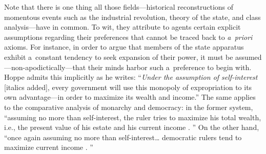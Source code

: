 Note that there is one thing all those fields---historical reconstructions of momentous events such as the industrial revolution, theory of the state, and class analysis---have in common. To wit, they attribute to agents certain explicit assumptions regarding their preferences that cannot be traced back to \textit{a~priori} axioms. For instance, in order to argue that members of the state apparatus exhibit a~constant tendency to seek expansion of their power, it must be assumed---non-apodictically---that their minds harbor such a~preference to begin with. Hoppe 
\parencite*[][p.15]{hoppe_democracy_2007} %
 admits this implicitly as he writes: ``\textit{Under the assumption of self-interest} [italics added], every government will use this monopoly of expropriation to its own advantage---in order to maximize its wealth and income.'' The same applies to the comparative analysis of monarchy and democracy: in the former system, ``assuming no more than self-interest, the ruler tries to maximize his total wealth, i.e., the present value of his estate and his current income 
\parencite[][p.18]{hoppe_democracy_2007}.%
'' On the other hand, ``once again assuming no more than self-interest… democratic rulers tend to maximize current income 
\parencite[][p.144]{hoppe_democracy_2007}.%
''




